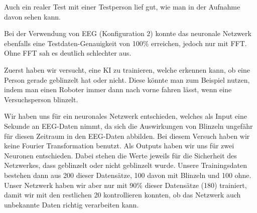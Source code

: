 \documentclass[11pt]{scrartcl}
\begin{document}
	Auch ein realer Test mit einer Testperson lief gut, wie man in der Aufnahme davon sehen kann. \cite{projekt-video}

	Bei der Verwendung von EEG (Konfiguration 2) konnte das neuronale Netzwerk ebenfalls eine Testdaten-Genauigkeit von 100\% erreichen, jedoch nur mit FFT. Ohne FFT sah es deutlich schlechter aus.

	\begin{figure}[H]
	\end{figure}













	Zuerst haben wir versucht, eine KI zu trainieren, welche erkennen kann, ob eine Person gerade geblinzelt hat oder nicht. Diese könnte man zum Beispiel nutzen, indem man einen Roboter immer dann nach vorne fahren lässt, wenn eine Versuchsperson blinzelt.

	Wir haben uns für ein neuronales Netzwerk entschieden, welches als Input eine Sekunde an EEG-Daten nimmt, da sich die Auswirkungen von Blinzeln ungefähr für diesen Zeitraum in den EEG-Daten abbilden. Bei diesem Versuch haben wir keine Fourier Transformation benutzt. Als Outputs haben wir uns für zwei Neuronen entschieden. Dabei stehen die Werte jeweils für die Sicherheit des Netzwerkes, dass geblinzelt oder nicht geblinzelt wurde.
	Unsere Trainingsdaten bestehen dann aus 200 dieser Datensätze, 100 davon mit Blinzeln und 100 ohne. Unser Netzwerk haben wir aber nur mit 90\% dieser Datensätze (180) trainiert, damit wir mit den restlichen 20 kontrollieren konnten, ob das Netzwerk auch unbekannte Daten richtig verarbeiten kann.
\end{document}
